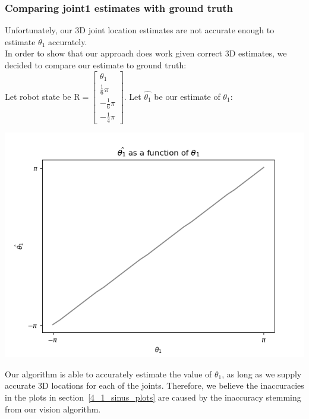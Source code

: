 \subsubsection{Comparing joint1 estimates with ground truth}
Unfortunately, our 3D joint location estimates are not accurate enough
to estimate $\theta_1$ accurately.\\
In order to show that our approach does work given correct 3D estimates,
we decided to compare our estimate to ground truth:\\
Let robot state be $\text{R} = \begin{bmatrix}
    \theta_1 \\
    \frac{1}{6} \pi \\
    -\frac{1}{6} \pi \\
    -\frac{1}{4} \pi
\end{bmatrix} $. Let $\hat{\theta_1}$ be our estimate of $\theta_1$:
\begin{center}
    \includegraphics[width=0.4\linewidth]{plots/theta1_estimation.png}
\end{center}
Our algorithm is able to accurately estimate the value of $\theta_1$,
as long as we supply accurate 3D locations for each of the joints.
Therefore, we believe the inaccuracies in the plots in section~\ref{4_1_sinus_plots}
are caused by the inaccuracy stemming from our vision algorithm.
